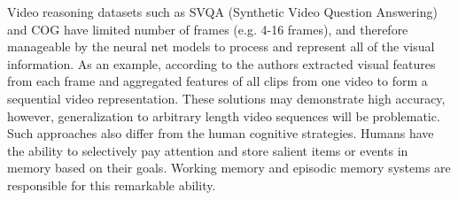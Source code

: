 Video reasoning datasets such as SVQA (Synthetic Video Question Answering)~\cite{song2018explore} and COG \cite{yang2018dataset} have limited number of frames (e.g. 4-16 frames), and therefore manageable by the neural net models to process and represent all of the visual information.  As an example, according to\cite{song2018explore} the authors extracted visual features from each frame and aggregated features of all clips from one video to form a sequential video representation.
These solutions may demonstrate high accuracy, however, generalization to arbitrary length video sequences will be problematic.  Such approaches also differ from the human cognitive strategies.  Humans have the ability to selectively pay attention and store salient items or events in memory based on their goals.  Working memory and episodic memory systems are responsible for this remarkable ability. 

%
%


%
%
%
%
%
%
%
%

